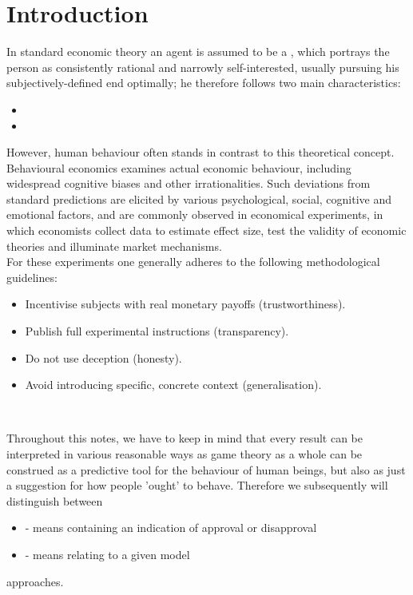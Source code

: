 \chapter*{Introduction} 


In standard economic theory an agent is assumed to be a , which portrays the person as consistently rational and narrowly self-interested, usually pursuing his subjectively-defined end optimally; he therefore follows two main characteristics:
\begin{itemize}
	\item {}
	\item {}
\end{itemize}
However, human behaviour often stands in contrast to this theoretical concept. Behavioural economics examines actual economic behaviour, including widespread cognitive biases and other irrationalities. Such deviations from standard predictions are elicited by various psychological, social, cognitive and emotional factors, and are commonly observed in economical experiments, in which economists collect data to estimate effect size, test the validity of economic theories and illuminate market mechanisms. \\
For these experiments one generally adheres to the following methodological guidelines: 
	\begin{itemize}
		\item Incentivise subjects with real monetary payoffs (trustworthiness).
		\item Publish full experimental instructions (transparency).
		\item Do not use deception (honesty).
		\item Avoid introducing specific, concrete context (generalisation).
	\end{itemize}
~	
	
Throughout this notes, we have to keep in mind that every result can be interpreted in various reasonable ways as game theory as a whole can be construed as a predictive tool for the behaviour of human beings, but also as just a suggestion for how people 'ought' to behave. Therefore we subsequently will distinguish between
\begin{itemize}
	\item {} - means containing an indication of approval or disapproval
	\item {} - means relating to a given model
\end{itemize}
approaches.